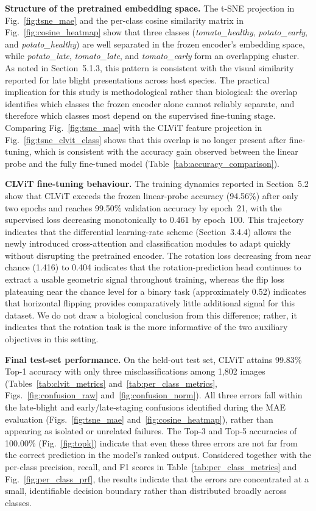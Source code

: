 \documentclass[conference]{IEEEtran}
\begin{document}
\textbf{Structure of the pretrained embedding space.}
The t-SNE projection in Fig.~\ref{fig:tsne_mae} and the per-class cosine similarity matrix in Fig.~\ref{fig:cosine_heatmap} show that three classes (\textit{tomato\_healthy}, \textit{potato\_early}, and \textit{potato\_healthy}) are well separated in the frozen encoder's embedding space, while \textit{potato\_late}, \textit{tomato\_late}, and \textit{tomato\_early} form an overlapping cluster. As noted in Section~5.1.3, this pattern is consistent with the visual similarity reported for late blight presentations across host species. The practical implication for this study is methodological rather than biological: the overlap identifies which classes the frozen encoder alone cannot reliably separate, and therefore which classes most depend on the supervised fine-tuning stage. Comparing Fig.~\ref{fig:tsne_mae} with the CLViT feature projection in Fig.~\ref{fig:tsne_clvit_class} shows that this overlap is no longer present after fine-tuning, which is consistent with the accuracy gain observed between the linear probe and the fully fine-tuned model (Table~\ref{tab:accuracy_comparison}).

\textbf{CLViT fine-tuning behaviour.}
The training dynamics reported in Section~5.2 show that CLViT exceeds the frozen linear-probe accuracy (94.56\%) after only two epochs and reaches 99.50\% validation accuracy by epoch~21, with the supervised loss decreasing monotonically to 0.461 by epoch~100. This trajectory indicates that the differential learning-rate scheme (Section~3.4.4) allows the newly introduced cross-attention and classification modules to adapt quickly without disrupting the pretrained encoder. The rotation loss decreasing from near chance (1.416) to 0.404 indicates that the rotation-prediction head continues to extract a usable geometric signal throughout training, whereas the flip loss plateauing near the chance level for a binary task (approximately 0.52) indicates that horizontal flipping provides comparatively little additional signal for this dataset. We do not draw a biological conclusion from this difference; rather, it indicates that the rotation task is the more informative of the two auxiliary objectives in this setting.

\textbf{Final test-set performance.}
On the held-out test set, CLViT attains 99.83\% Top-1 accuracy with only three misclassifications among 1,802 images (Tables~\ref{tab:clvit_metrics} and~\ref{tab:per_class_metrics}, Figs.~\ref{fig:confusion_raw} and~\ref{fig:confusion_norm}). All three errors fall within the late-blight and early/late-staging confusions identified during the MAE evaluation (Figs.~\ref{fig:tsne_mae} and~\ref{fig:cosine_heatmap}), rather than appearing as isolated or unrelated failures. The Top-3 and Top-5 accuracies of 100.00\% (Fig.~\ref{fig:topk}) indicate that even these three errors are not far from the correct prediction in the model's ranked output. Considered together with the per-class precision, recall, and F1 scores in Table~\ref{tab:per_class_metrics} and Fig.~\ref{fig:per_class_prf}, the results indicate that the errors are concentrated at a small, identifiable decision boundary rather than distributed broadly across classes.
\end{document}
